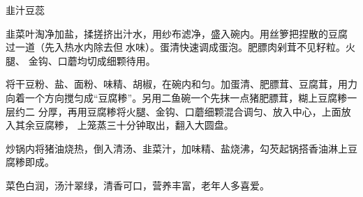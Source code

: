 \begin{recipe}{韭汁豆蕊}

\ingredients


\preparation

\step 韭菜叶淘净加盐，揉搓挤出汁水，用纱布滤净，盛入碗内。用丝箩把捏散的豆腐
过一道（先入热水内除去但𥑲水味）。蛋清快速调成蛋泡。肥膘肉剁茸不见籽粒。火腿、
金钩、口蘑均切成细颗待用。

\step 将干豆粉、盐、面粉、味精、胡椒，在碗内和匀。加蛋清、肥膘茸、豆腐茸，用力
向着一个方向搅匀成“豆腐糁”。另用二鱼碗一个先抹一点猪肥膘茸，糊上豆腐糁一层约二
分厚，再用豆腐糁将火腿、金钩、口蘑细颗混合调匀、放入中心，上面放入其余豆腐糁，
上笼蒸三十分钟取出，翻入大圆盘。

\step 炒锅内将猪油烧热，倒入清汤、韭菜汁，加味精、盐烧沸，勾芡起锅搭香油淋上豆
腐糁即成。

\features

菜色白润，汤汁翠绿，清香可口，营养丰富，老年人多喜爱。

\end{recipe}

